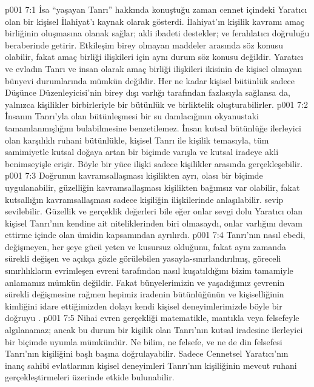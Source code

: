 \vs p001 7:1 İsa “yaşayan Tanrı” hakkında konuştuğu zaman cennet içindeki Yaratıcı olan bir kişisel İlahiyat’ı kaynak olarak gösterdi. İlahiyat’ın kişilik kavramı amaç birliğinin oluşmasına olanak sağlar; akli ibadeti destekler; ve ferahlatıcı doğruluğu beraberinde getirir. Etkileşim birey olmayan maddeler arasında söz konusu olabilir, fakat amaç birliği ilişkileri için aynı durum söz konusu değildir. Yaratıcı ve evladın Tanrı ve insan olarak amaç birliği ilişkileri ikisinin de kişisel olmayan bünyevi durumlarında mümkün değildir. Her ne kadar kişisel bütünlük sadece Düşünce Düzenleyicisi’nin birey dışı varlığı tarafından fazlasıyla sağlansa da, yalnızca kişilikler birbirleriyle bir bütünlük ve birliktelik oluşturabilirler.
\vs p001 7:2 İnsanın Tanrı’yla olan bütünleşmesi bir su damlacığının okyanustaki tamamlanmışlığını bulabilmesine benzetilemez. İnsan kutsal bütünlüğe ilerleyici olan karşılıklı ruhani bütünlükle, kişisel Tanrı ile kişilik temasıyla, tüm samimiyetle kutsal doğaya artan bir biçimde varışla ve kutsal iradeye akli benimseyişle erişir. Böyle bir yüce ilişki sadece kişilikler arasında gerçekleşebilir.
\vs p001 7:3 Doğrunun kavramsallaşması kişilikten ayrı, olası bir biçimde uygulanabilir, güzelliğin kavramsallaşması kişilikten bağımsız var olabilir, fakat kutsallığın kavramsallaşması sadece kişiliğin ilişkilerinde anlaşılabilir.  sevip sevilebilir. Güzellik ve gerçeklik değerleri bile eğer onlar sevgi dolu Yaratıcı olan kişisel Tanrı’nın kendine ait niteliklerinden biri olmasaydı, onlar varlığını devam ettirme içinde olan ümidin kapsamından ayrılırdı.
\vs p001 7:4 Tanrı’nın nasıl ebedi, değişmeyen, her şeye gücü yeten ve kusursuz olduğunu, fakat aynı zamanda sürekli değişen ve açıkça gözle görülebilen yasayla\hyp{}sınırlandırılmış, göreceli sınırlılıkların evrimleşen evreni tarafından nasıl kuşatıldığını bizim tamamiyle anlamamız mümkün değildir. Fakat bünyelerimizin ve yaşadığımız çevrenin sürekli değişmesine rağmen hepimiz iradenin bütünlüğünün ve kişiselliğinin kimliğini idare ettiğimizden dolayı kendi kişisel deneyimlerimizde böyle bir doğruyu .
\vs p001 7:5 Nihai evren gerçekliği matematikle, mantıkla veya felsefeyle algılanamaz; ancak bu durum bir kişilik olan Tanrı’nın kutsal iradesine ilerleyici bir biçimde uyumla mümkündür. Ne bilim, ne felsefe, ve ne de din felsefesi Tanrı’nın kişiliğini başlı başına doğrulayabilir. Sadece Cennetsel Yaratıcı’nın inanç sahibi evlatlarının kişisel deneyimleri Tanrı’nın kişiliğinin mevcut ruhani gerçekleştirmeleri üzerinde etkide bulunabilir.
